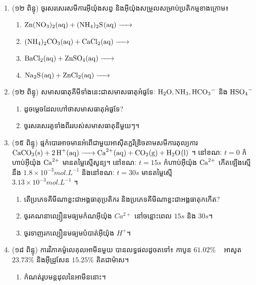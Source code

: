 \documentclass{officialexam}
\begin{document}
	{\maketitle}\\
	\begin{enumerate}[I]
		\item {\color{khtug}(១២ ពិន្ទុ)} ចូរសរសេរសមីការអុីយ៉ុងសព្វ និងអុីយ៉ុងសម្រួលសម្រាប់ប្រតិកម្មខាងក្រោម៖
		\begin{enumerate}[k]
			\item $\ce{Zn(NO3)_2(aq) + (NH4)_2S(aq) -> }$
			\item $\ce{(NH4)_2CO_3(aq) + CaCl2_(aq) -> }$
			\item $\ce{BaCl2_(aq) + ZnSO4_(aq) -> }$
			\item $\ce{Na2S_(aq) + ZnCl2_(aq) -> }$
		\end{enumerate}
	 	\item {\color{khtug}(១២ ពិន្ទុ)} សមាសធាតុគីមីទាំងនេះជាសមាសធាតុអំផូទែៈ $\ce{H2O,NH3,HCO3^{-}}$ និង $\ce{HSO4^{-}}$
	 	\begin{enumerate}[k]
	 		\item ដូចម្តេចដែលហៅថាសមាសធាតុអំផូទែ?
	 		\item ចូរសរសេរគូទាំងពីររបស់សមាសធាតុនីមួយៗ។
	 	\end{enumerate}
 		\item {\color{khtug}(១៥ ពិន្ទុ)} ផ្មកំបោរអាចមានអំពើជាមួយអាស៊ីតក្លរីឌ្រិចតាមសមីការតុល្យការ\\ $\ce{CaCO3_(s) + 2H^{+}_(aq) -> Ca^{2+}_(aq) + CO2_(g) + H2O_(l)}$ ។ នៅខណៈ $t=0$ កំហាប់អុីយ៉ុង $\ce{Ca^{2+}}$ មានតម្លៃស្មើសូន្យ។ នៅខណៈ $t=15s$ កំហាប់អុីយ៉ុង $\ce{Ca^{2+}}$ កើតឡើងស្មើនឹង $1.8\times10^{-3}mol.L^{-1}$ និងនៅខណៈ $t=30s$ មានតម្លៃស្មើ\\ $3.13\times10^{-3}mol.L^{-1}$ ។
 		\begin{enumerate}[k]
 			\item តើប្រភេទគីមីណាខ្លះជាអង្គធាតុប្រតិករ និងប្រភេទគីមីណាខ្លះជាអង្គធាតុកកើត?
 			\item ចូរគណនាល្បឿនមធ្យមកំណអុីយ៉ុង $Ca^{2+}$ នៅចន្លោះពេល $15s$ និង $30s$។
 			\item ចូរទាញរកល្បឿនមធ្យមបំបាត់អុីយ៉ុង $H^{+}$។
 		\end{enumerate}
 		\item {\color{khtug}(១៨ ពិន្ទុ)} ការវិភាគម៉ូលេគុលអាមីនមួយ បានលទ្ធផលដូចតទៅ៖ កាបូន $61.02\%$ ~ អាសូត $23.73\%$ និងអុីដ្រូសែន $15.25\%$ គិតជាម៉ាស។
 		\begin{enumerate}[k]
 			\item កំណត់រូបមន្តដុលនៃអាមីននោះ។

\end{enumerate}
\end{enumerate}
\end{document}
